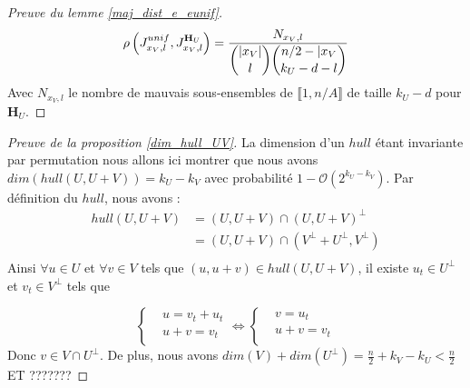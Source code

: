 \documentclass[12pt]{article}
\theoremstyle{plain}
\begin{document}
\begin{proof}[Preuve du lemme \ref{maj_dist_e_eunif}]
\begin{equation}
\rho\left(J_{x_V,l}^{unif},J_{x_V, l}^{\mathbf{H}_U}\right) = \frac{N_{x_V,l}}{\dbinom{|x_V|}{l}\dbinom{n/2-|x_V}{k_U-d-l}}
\end{equation}
Avec $N_{x_V,l}$ le nombre de mauvais sous-ensembles de $\llbracket1,n/A\rrbracket$ de taille $k_U-d$ pour $\mathbf{H}_U$.
\end{proof}


\begin{proof}[Preuve de la proposition \ref{dim_hull_UV}]
La dimension d'un $hull$ étant invariante par permutation nous allons ici montrer que nous avons $dim(hull(U,U+V)) = k_U - k_V$ avec probabilité $1-\mathcal{O}(2^{k_U-k_V})$.
Par définition du $hull$, nous avons :
\begin{equation*}
\begin{split}
hull(U,U+V) &= (U,U+V) \cap (U,U+V)^{\bot } \\
&= (U,U+V) \cap (V^{\bot}+U^{\bot}, V^{\bot}) \\
\end{split}
\end{equation*} 
Ainsi $\forall u\in U$ et $\forall v\in V$ tels que $(u,u+v)\in hull(U,U+V)$, il existe $u_t\in U^{\bot}$ et $v_t\in V^{\bot}$ tels que

\begin{equation*}
\left\{
\begin{aligned}
&u = v_t + u_t\\
&u + v = v_t\\
\end{aligned}
\right.
\iff
\left\{
\begin{aligned}
&v = u_t\\
&u + v = v_t\\
\end{aligned}
\right.
\end{equation*}
Donc $v\in V\cap U^{\bot}$.
De plus, nous avons $dim(V) + dim(U^{\bot}) = \frac{n}{2} +k_V - k_U < \frac{n}{2}$
ET ???????
\end{proof}
\end{document}

